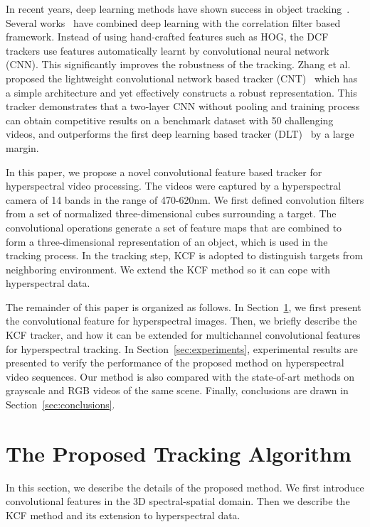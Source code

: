 \documentclass[runningheads,a4paper]{llncs}
\begin{document}
In recent years, deep learning methods have shown success in object tracking~\cite{a6,a7,a8}. Several works~\cite{a9,a10} have combined deep learning with the correlation filter based framework. Instead of using hand-crafted features such as HOG, the DCF trackers use features automatically learnt by convolutional neural network (CNN). This significantly improves the robustness of the tracking. Zhang et al. proposed the lightweight convolutional network based tracker (CNT)~\cite{CNT} which has a simple architecture and yet effectively constructs a robust representation. This tracker demonstrates that a two-layer CNN without pooling and training process can obtain competitive results on a benchmark dataset with 50 challenging videos, and outperforms the first deep learning based tracker (DLT)~\cite{DLT} by a large margin.

In this paper, we propose a novel convolutional feature based tracker for hyperspectral video processing. The videos were captured by a hyperspectral camera of 14 bands in the range of 470-620nm. We first defined convolution filters from a set of normalized three-dimensional cubes surrounding a target. The convolutional operations generate a set of feature maps that are combined to form a three-dimensional representation of an object, which is used in the tracking process. In the tracking step, KCF is adopted to distinguish targets from neighboring environment. We extend the KCF method so it can cope with hyperspectral data.

The remainder of this paper is organized as follows. In Section~\ref{sec:method}, we first present the convolutional feature for hyperspectral images. Then, we briefly describe the KCF tracker, and how it can be extended for multichannel convolutional features for hyperspectral tracking. In Section~\ref{sec:experiments}, experimental results are presented to verify the performance of the proposed method on hyperspectral video sequences. Our method is also compared with the state-of-art methods on grayscale and RGB videos of the same scene. Finally, conclusions are drawn in Section~\ref{sec:conclusions}.

\section{The Proposed Tracking Algorithm}\label{sec:method}
In this section, we describe the details of the proposed method. We first introduce convolutional features in the 3D spectral-spatial domain. Then we describe the KCF method and its extension to hyperspectral data.
\end{document}
